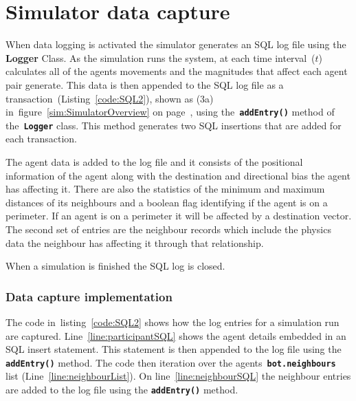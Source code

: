 \chapter{Simulator data capture}\label{app5}

When data logging is activated the simulator generates an SQL log file using the \textbf{Logger} Class. As the simulation runs the system, at each time interval~($t$) calculates all of the agents movements and the magnitudes that affect each agent pair generate. This data is then appended to the SQL log file as a transaction~(Listing~\ref{code:SQL2}), shown as (3a) in~figure~\ref{sim:SimulatorOverview} on page~\pageref{sim:SimulatorOverview}, using the~\texttt{\textbf{addEntry()}} method of the~\texttt{\textbf{Logger}} class. This method generates two SQL insertions that are added for each transaction. 

The agent data is added to the log file and it consists of the positional information of the agent along with the destination and directional bias the agent has affecting it. There are also the statistics of the minimum and maximum distances of its neighbours and a boolean flag identifying if the agent is on a perimeter. If an agent is on a perimeter it will be affected by a destination vector. The second set of entries are the neighbour records which include the physics data the neighbour has affecting it through that relationship. 

When a simulation is finished the SQL log is closed. 

\subsection{Data capture implementation}
The code in~listing~\ref{code:SQL2} shows how the log entries for a simulation run are captured. Line~\ref{line:participantSQL} shows the agent details embedded in an SQL insert statement. This statement is then appended to the log file using the \texttt{\textbf{addEntry()}} method. The code then iteration over the agents~\texttt{\textbf{bot.neighbours}} list (Line~\ref{line:neighbourList}). On line~\ref{line:neighbourSQL} the neighbour entries are added to the log file using the \texttt{\textbf{addEntry()}} method.

